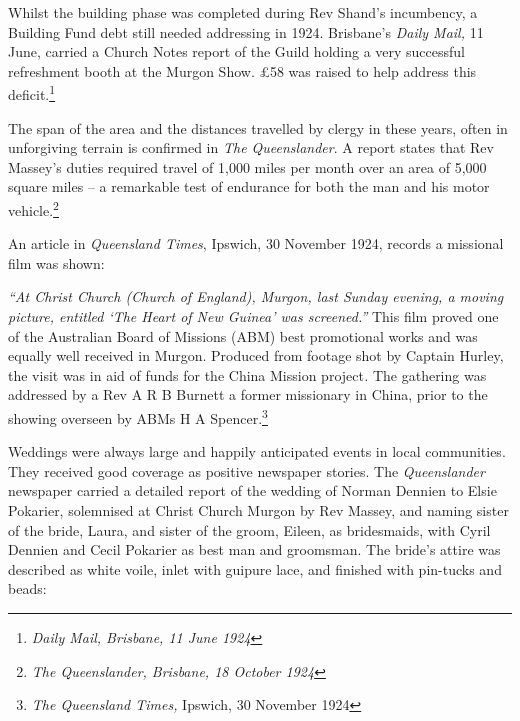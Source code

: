 Whilst the building phase was completed during Rev Shand's incumbency, a Building Fund debt still needed addressing in 1924. Brisbane's \emph{Daily Mail,} 11 June, carried a Church Notes report of the Guild holding a very successful refreshment booth at the Murgon Show. \pounds58 was raised to help address this deficit.\footnote{\emph{Daily Mail, Brisbane, 11 June 1924}}


The span of the area and the distances travelled by clergy in these years, often in unforgiving terrain is confirmed in \emph{The Queenslander}. A report states that Rev Massey's duties required travel of 1,000 miles per month over an area of 5,000 square miles -- a remarkable test of endurance for both the man and his motor vehicle.\footnote{\emph{The Queenslander, Brisbane, 18 October 1924}}


An article in \emph{Queensland Times}, Ipswich, 30 November 1924, records a missional film was shown:



\emph{``At Christ Church (Church of England), Murgon, last Sunday evening, a moving picture, entitled `The Heart of New Guinea' was screened.''} This film proved one of the Australian Board of Missions (ABM) best promotional works and was equally well received in Murgon. Produced from footage shot by Captain Hurley, the visit was in aid of funds for the China Mission project\emph{.} The gathering was addressed by a Rev A R B Burnett a former missionary in China, prior to the showing overseen by ABMs H A Spencer.\footnote{\emph{The Queensland Times,} Ipswich, 30 November 1924}


Weddings were always large and happily anticipated events in local communities. They received good coverage as positive newspaper stories. The \emph{Queenslander} newspaper carried a detailed report of the wedding of Norman Dennien to Elsie Pokarier, solemnised at Christ Church Murgon by Rev Massey, and naming sister of the bride, Laura, and sister of the groom, Eileen, as bridesmaids, with Cyril Dennien and Cecil Pokarier as best man and groomsman. The bride's attire was described as white voile, inlet with guipure lace, and finished with pin-tucks and beads:




